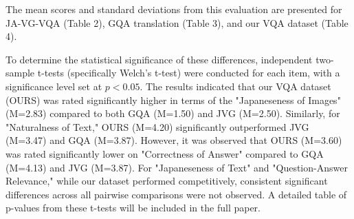\documentclass[11pt]{article}
\begin{document}
The mean scores and standard deviations from this evaluation are presented for JA-VG-VQA (Table 2), GQA translation (Table 3), and our VQA dataset (Table 4).

To determine the statistical significance of these differences, independent two-sample t-tests (specifically Welch's t-test) were conducted for each item, with a significance level set at $p < 0.05$. The results indicated that our VQA dataset (OURS) was rated significantly higher in terms of the "Japaneseness of Images" (M=2.83) compared to both GQA (M=1.50) and JVG (M=2.50). Similarly, for "Naturalness of Text," OURS (M=4.20) significantly outperformed JVG (M=3.47) and GQA (M=3.87). However, it was observed that OURS (M=3.60) was rated significantly lower on "Correctness of Answer" compared to GQA (M=4.13) and JVG (M=3.87). For "Japaneseness of Text" and "Question-Answer Relevance," while our dataset performed competitively, consistent significant differences across all pairwise comparisons were not observed. A detailed table of p-values from these t-tests will be included in the full paper.
\end{document}
